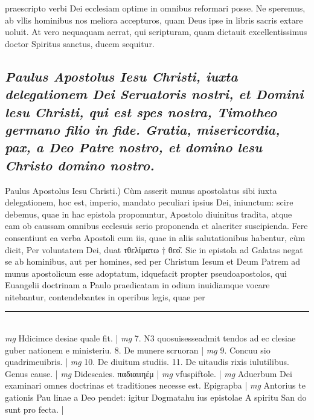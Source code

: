 \documentclass{article}
\begin{document}
\begin{pages}
praescripto verbi Dei ecclesiam optime in omnibus reformari posse. Ne speremus, ab vllis hominibus nos meliora accepturos, quam Deus ipse in libris sacris extare uoluit. At vero nequaquam aerrat, qui scripturam, quam dictauit excellentissimus doctor Spiritus sanctus, ducem sequitur.  \pend
{}
{}
\subsection*{\textit{Paulus Apostolus Iesu Christi, iuxta delegationem Dei Seruatoris nostri, et Domini lesu Christi, qui est spes nostra, Timotheo germano filio in fide. Gratia, misericordia, pax, a Deo Patre nostro, et domino lesu Christo domino nostro. }}\pstart Paulus Apostolus Iesu Christi.) Cùm asserit munus apostolatus sibi iuxta delegationem, hoc est, imperio, mandato peculiari ipsius Dei, iniunctum: scire debemus, quae in hac epistola proponuntur, Apostolo diuinitus tradita, atque  eam ob caussam omnibus ecclesuis serio proponenda et alacriter suscipienda. Fere consentiunt ea verba Apostoli cum iis, quae in aliis salutationibus habentur, cùm dicit, Per voluntatem Dei, duat τθελίματω † θεο͂. Sic in epistola ad Galatas negat se ab hominibus, aut per homines, sed per Christum Iesum et Deum Patrem ad munus apostolicum esse adoptatum, idquefacit propter pseudoapostolos, qui Euangelii doctrinam a Paulo praedicatam in odium inuidiamque  vocare nitebantur, contendebantes in operibus legis, quae per  \pend
\vspace{0.5cm}\noindent
\vspace{0.2cm}\rule{1cm}{0.2pt}\\ 
\hspace{0.2cm}\textit{mg}
\footnotesize Hdicimce desiae quale fit. 
\normalsize| 
\hspace{0.2cm}\textit{mg}
\footnotesize 7. N3 quosuisesseadmit tendos ad ec clesiae guber nationem e ministeriu. 8. De munere scruoran
\normalsize| 
\hspace{0.2cm}\textit{mg}
\footnotesize 9. Concuu sio quadrimeuibris. 
\normalsize| 
\hspace{0.2cm}\textit{mg}
\footnotesize 10. De diuitum studiis. 11. De uitaudis rixis iulutilibus. Genus cause. 
\normalsize| 
\hspace{0.2cm}\textit{mg}
\footnotesize Didescaies. παδιαιιηέμ 
\normalsize| 
\hspace{0.2cm}\textit{mg}
\footnotesize vfuspiftole. 
\normalsize| 
\hspace{0.2cm}\textit{mg}
\footnotesize Aduerbum Dei examinari omnes doctrinas et traditiones necesse est. Epigrapba
\normalsize| 
\hspace{0.2cm}\textit{mg}
\footnotesize Antorius te gationis Pau linae a Deo pendet: igitur Dogmatahu ius epistolae A spiritu San do sunt pro fecta. 
\normalsize| 

\end{pages}
\end{document}
